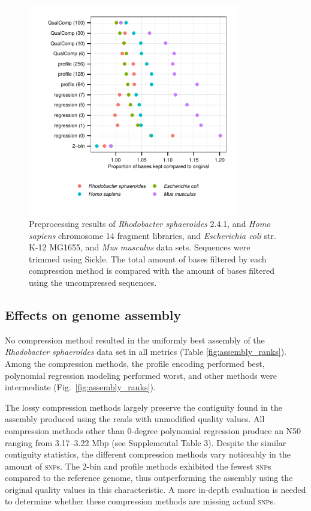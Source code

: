 \documentclass{bioinfo}
\begin{document}
\begin{figure}[!tbp]
\centerline{\includegraphics[width=3.65in]{preprocessing_results.pdf}}
\caption{Preprocessing results of \textit{Rhodobacter sphaeroides}
  2.4.1, and \textit{Homo sapiens} chromosome 14 fragment libraries,
  and \textit{Escherichia coli} str. K-12 MG1655, and \textit{Mus
    musculus} data sets. Sequences were trimmed using Sickle. The
  total amount of bases filtered by each compression method is
  compared with the amount of bases filtered using the uncompressed
  sequences.}
  \label{fig:preprocessing}
\end{figure}

\subsection{Effects on genome assembly}

No compression method resulted in the uniformly best assembly of the
\textit{Rhodobacter sphaeroides} data set in all metrics (Table
\ref{fig:assembly_ranks}). Among the compression methods, the profile
encoding performed best, polynomial regression modeling performed
worst, and other methods were intermediate
(Fig.~\ref{fig:assembly_ranks}).

The lossy compression methods largely preserve the contiguity found in
the assembly produced using the reads with unmodified quality
values. All compression methods other than 0-degree polynomial
regression produce an N50 ranging from 3.17--3.22 Mbp (see
Supplemental Table 3). Despite the similar contiguity statistics, the
different compression methods vary noticeably in the amount of
\textsc{snp}s. The 2-bin and profile methods exhibited the fewest
\textsc{snp}s compared to the reference genome, thus outperforming the
assembly using the original quality values in this characteristic. A
more in-depth evaluation is needed to determine whether these
compression methods are missing actual \textsc{snp}s.
\end{document}
